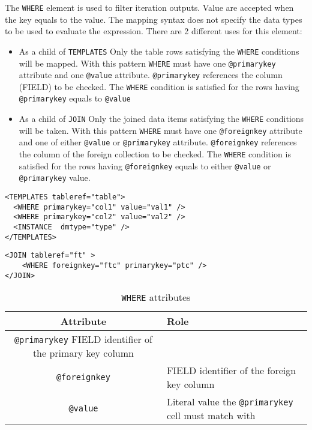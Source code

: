 The \texttt{WHERE} element is used to filter iteration outputs. Value are accepted when the key equals to the value. The mapping syntax does not specify the data types to be used to evaluate the expression. 
There  are 2 different uses for this element:
\begin{itemize}
    \item As a child of \texttt{TEMPLATES}  Only the table rows satisfying the \texttt{WHERE} conditions will be mapped. 
             With this pattern \texttt{WHERE} must have one \texttt{@primarykey} attribute and one \texttt{@value} attribute. 
              \texttt{@primarykey} references the column (FIELD) to be checked. 
             The \texttt{WHERE} condition is satisfied for the rows having \texttt{@primarykey} equals to \texttt{@value}     \item As a child of \texttt{JOIN}  Only the joined data items satisfying the \texttt{WHERE} conditions will be taken. 
             With this pattern \texttt{WHERE} must have one \texttt{@foreignkey} attribute and one of either \texttt{@value} or \texttt{@primarykey} attribute. 
              \texttt{@foreignkey} references the column of the foreign collection to be checked. 
             The \texttt{WHERE} condition is satisfied for the rows having \texttt{@foreignkey} equals to either \texttt{@value} or \texttt{@primarykey} value.
\end{itemize}
\begin{lstlisting}[frame=single,caption={\texttt{WHERE} Example: only rows having val1 as col1 value and  val2 as col2 value are mapped},style=XML,basicstyle=\tiny]
<TEMPLATES tableref="table">
  <WHERE primarykey="col1" value="val1" />
  <WHERE primarykey="col2" value="val2" />
  <INSTANCE  dmtype="type" />
</TEMPLATES>
\end{lstlisting}

\begin{lstlisting}[frame=single,caption={\texttt{WHERE} Example: the join is satisfied when the value of the ptc column  is equals to the ftc column of the foreign table },style=XML,basicstyle=\tiny]
<JOIN tableref="ft" >
	<WHERE foreignkey="ftc" primarykey="ptc" />
</JOIN>
\end{lstlisting}

\begin{table}[!htbp]
\small
\centering
\begin{tabulary}{\linewidth}{|c|J|}       
       \hline 
            \textbf{Attribute} & 
            \textbf {Role}\\
       \hline         \hline  
            \texttt{@primarykey}  
            FIELD identifier of the primary key column \\
        \hline 
            \texttt{@foreignkey} & 
            FIELD identifier of the foreign key column \\
        \hline 
            \texttt{@value} & 
            Literal value the  \texttt{@primarykey} cell must match with\\
        \hline 
     \end{tabulary}
     \caption{\texttt{WHERE} attributes} 
     \label{tbl:where-att}
 \end{table}

